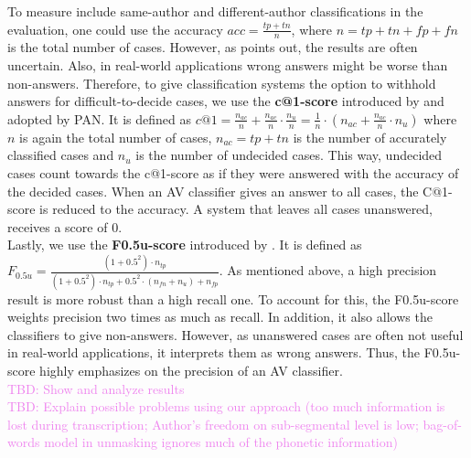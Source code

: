 To measure include same-author and different-author classifications in the evaluation, one could use the accuracy $acc = \frac{tp+tn}{n}$, where $n = tp+tn+fp+fn$ is the total number of cases.
However, as \cite{bevendorff2019unmaskingShortTexts} points out, the results are often uncertain.
Also, in real-world applications wrong answers might be worse than non-answers.
Therefore, to give classification systems the option to withhold answers for difficult-to-decide cases, we use the \textbf{c@1-score} introduced by \cite{penas2011c_at_1} and adopted by PAN.
It is defined as $c@1 = \frac{n_{ac}}{n}+\frac{n_{ac}}{n}\cdot{}\frac{n_u}{n} = \frac{1}{n}\cdot{}\left(n_{ac}+\frac{n_{ac}}{n}\cdot{}n_u\right)$ where $n$ is again the total number of cases, $n_{ac} = tp+tn$ is the number of accurately classified cases and $n_u$ is the number of undecided cases.
This way, undecided cases count towards the c@1-score as if they were answered with the accuracy of the decided cases.
When an AV classifier gives an answer to all cases, the C@1-score is reduced to the accuracy.
A system that leaves all cases unanswered, receives a score of 0.\\
Lastly, we use the \textbf{F0.5u-score} introduced by \cite{bevendorff2019unmaskingShortTexts}.
It is defined as $F_{0.5u} = \frac{(1+0.5^2)\cdot{}n_{tp}}{(1+0.5^2)\cdot{}n_{tp}+0.5^2\cdot{}(n_{fn}+n_u)+n_{fp}}$.
As mentioned above, a high precision result is more robust than a high recall one.
To account for this, the F0.5u-score weights precision two times as much as recall.
In addition, it also allows the classifiers to give non-answers.
However, as unanswered cases are often not useful in real-world applications, it interprets them as wrong answers.
Thus, the F0.5u-score highly emphasizes on the precision of an AV classifier.\\

\textcolor{violet}{
TBD: Show and analyze results\\
TBD: Explain possible problems using our approach (too much information is lost during transcription; Author's freedom on sub-segmental level is low; bag-of-words model in unmasking ignores much of the phonetic information)\\
}





